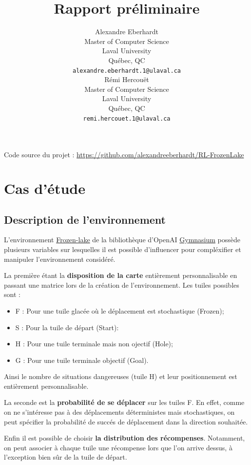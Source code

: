 \documentclass{article}
\title{Rapport préliminaire}
\author{\hspace{1mm}Alexandre Eberhardt\\
	Master of Computer Science\\
	Laval University\\
	Québec, QC \\
	\texttt{alexandre.eberhardt.1@ulaval.ca} \\
	\And
    \hspace{1mm}Rémi Hercouët \\
	Master of Computer Science\\
	  Laval University\\
	Québec, QC \\
	\texttt{remi.hercouet.1@ulaval.ca} \\
}
\begin{document}
\maketitle
\vspace{-0.5cm}

\begin{center}
    Code source du projet : \url{https://github.com/alexandreeberhardt/RL-FrozenLake}
\end{center}
\section{Cas d'étude}



\subsection{Description de l'environnement}
L'environnement \href{https://gymnasium.farama.org/environments/toy_text/frozen_lake/}{Frozen-lake} de la bibliothèque d'OpenAI \href{https://gymnasium.farama.org/index.html}{Gymnasium} possède plusieurs variables sur lesquelles il est possible d'influencer pour compléxifier et manipuler l'environnement considéré.

La première étant la \textbf{disposition de la carte} entièrement personnalisable en passant une matrice lors de la création de l'environnement. Les tuiles possibles sont :
\begin{itemize}
    \item F : Pour une tuile glacée où le déplacement est stochastique (Frozen);
    \item S : Pour la tuile de départ (Start):
    \item H : Pour une tuile terminale mais non ojectif (Hole);
    \item G : Pour une tuile terminale objectif (Goal). 
\end{itemize}
Ainsi le nombre de situations dangereuses (tuile H) et leur positionnement est entièrement personnalisable.

La seconde est la \textbf{probabilité de se déplacer} sur les tuiles F. En effet, comme on ne s'intéresse pas à des déplacements déterministes mais stochastiques, on peut spécifier la probabilité de succés de déplacement dans la direction souhaitée.

Enfin il est possible de choisir \textbf{la distribution des récompenses}. Notamment, on peut associer à chaque tuile une récompense lors que l'on arrive dessus, à l'exception bien sûr de la tuile de départ.
\end{document}
